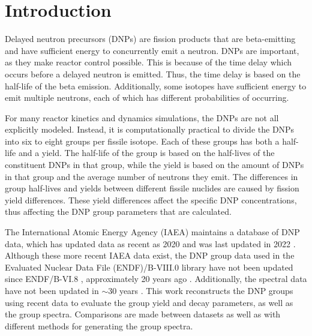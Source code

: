 \documentclass{style/nseJournal}
\begin{document}
\section{Introduction}

Delayed neutron precursors (DNPs) are fission products that are beta-emitting and have sufficient energy to concurrently emit a neutron.
DNPs are important, as they make reactor control possible.
This is because of the time delay which occurs before a delayed neutron is emitted.
Thus, the time delay is based on the half-life of the beta emission.
Additionally, some isotopes have sufficient energy to emit multiple neutrons, each of which has different probabilities of occurring.

For many reactor kinetics and dynamics simulations, the DNPs are not all explicitly modeled.
Instead, it is computationally practical to divide the DNPs into six to eight groups per fissile isotope. 
Each of these groups has both a half-life and a yield.
The half-life of the group is based on the half-lives of the constituent DNPs in that group, while the yield is based on the amount of DNPs in that group and the average number of neutrons they emit.
The differences in group half-lives and yields between different fissile nuclides are caused by fission yield differences.
These yield differences affect the specific DNP concentrations, thus affecting the DNP group parameters that are calculated.

The International Atomic Energy Agency (IAEA) maintains a database of DNP data, which has updated data as recent as 2020 and was last updated in 2022 \cite{DIMITRIOU2021144}.
Although these more recent IAEA data exist, the DNP group data used in the Evaluated Nuclear Data File (ENDF)/B-VIII.0 library have not been updated since ENDF/B-VI.8 \cite{BROWN20181}, approximately 20 years ago \cite{parish1999status}. Additionally, the spectral data have not been updated in $\sim$30 years \cite{CHADWICK20062931, dnpthesis}. This work reconstructs the DNP groups using recent data to evaluate the group yield and decay parameters, as well as the group spectra.
Comparisons are made between datasets as well as with different methods for generating the group spectra.
\end{document}
